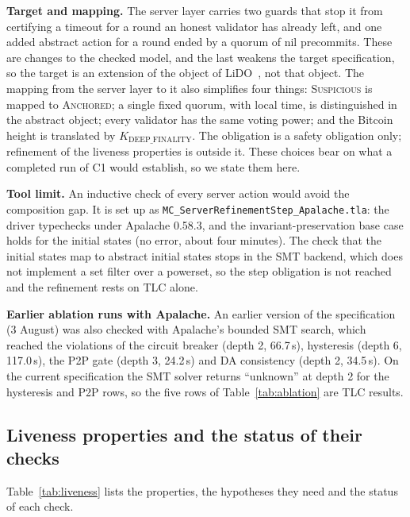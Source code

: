 \textbf{Target and mapping.} The server layer carries two guards that
stop it from certifying a timeout for a round an honest validator has already
left, and one added abstract action for a round ended by a quorum of nil
precommits. These are changes to the checked model, and the last weakens the
target specification, so the target is an extension of the object of
LiDO~\cite{qiu2024lido}, not that object. The mapping from the server layer to it
also simplifies four things: \textsc{Suspicious} is mapped to \textsc{Anchored}; a
single fixed quorum, with local time, is distinguished in the abstract object;
every validator has the same voting power; and the Bitcoin height is translated
by $K_{\text{DEEP\_FINALITY}}$. The obligation is a safety obligation only;
refinement of the liveness properties is outside it. These choices bear on what a
completed run of C1 would establish, so we state them here.

\textbf{Tool limit.} An inductive check of every server action would avoid the
composition gap. It is set up as \texttt{MC\_ServerRefinementStep\_Apalache.tla}:
the driver typechecks under Apalache 0.58.3, and the invariant-preservation base
case holds for the initial states (no error, about four minutes). The check that
the initial states map to abstract initial states stops in the SMT backend, which
does not implement a set filter over a powerset, so the step obligation is not
reached and the refinement rests on TLC alone.

\textbf{Earlier ablation runs with Apalache.} An earlier version of the specification
(3 August) was also checked with Apalache's bounded SMT search, which reached the
violations of the circuit breaker (depth 2, 66.7\,s), hysteresis (depth 6, 117.0\,s),
the P2P gate (depth 3, 24.2\,s) and DA consistency (depth 2, 34.5\,s). On the current
specification the SMT solver returns ``unknown'' at depth 2 for the hysteresis and P2P
rows, so the five rows of Table~\ref{tab:ablation} are TLC results.

\subsection*{Liveness properties and the status of their checks}

Table~\ref{tab:liveness} lists the properties, the hypotheses they need and the status of each check.

